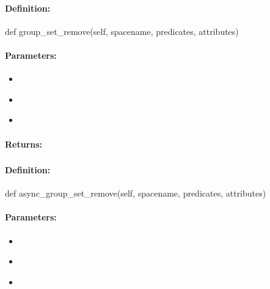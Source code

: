 \paragraph{Definition:}
\begin{pythoncode}
def group_set_remove(self, spacename, predicates, attributes)
\end{pythoncode}

\paragraph{Parameters:}
\begin{itemize}[noitemsep]
\item {}\\

\item {}\\

\item {}\\

\end{itemize}

\paragraph{Returns:}


\pagebreak
\subsubsection{}
\label{api:python:async_group_set_remove}


\paragraph{Definition:}
\begin{pythoncode}
def async_group_set_remove(self, spacename, predicates, attributes)
\end{pythoncode}

\paragraph{Parameters:}
\begin{itemize}[noitemsep]
\item {}\\

\item {}\\

\item {}\\

\end{itemize}


